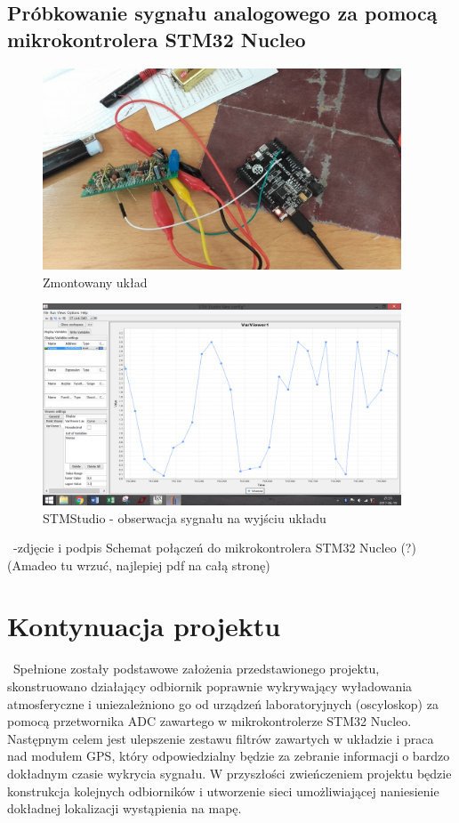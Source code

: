 \documentclass[12pt]{article}
\begin{document}
\subsection{Próbkowanie sygnału analogowego za pomocą mikrokontrolera STM32 Nucleo}
\begin{figure}[H]
\begin{center}
\includegraphics[width=0.95\textwidth]{figures/uklad.png}
\caption{Zmontowany układ}
\end{center}
\end{figure}
\begin{figure}[H]
\begin{center}
\includegraphics[width=0.95\textwidth]{figures/stm.png}
\caption{STMStudio - obserwacja sygnału na wyjściu układu}
\end{center}
\end{figure}
\ -zdjęcie i podpis Schemat połączeń do mikrokontrolera STM32 Nucleo (?)\\
(Amadeo tu wrzuć, najlepiej pdf na całą stronę)

\section{Kontynuacja projektu}
\ Spełnione zostały podstawowe założenia przedstawionego projektu, skonstruowano działający odbiornik poprawnie wykrywający wyładowania atmosferyczne i uniezależniono go od urządzeń laboratoryjnych (oscyloskop) za pomocą przetwornika ADC zawartego w mikrokontrolerze STM32 Nucleo. Następnym celem jest ulepszenie zestawu filtrów zawartych w układzie i praca nad modułem GPS, który odpowiedzialny będzie za zebranie informacji o bardzo dokładnym czasie wykrycia sygnału. W przyszłości zwieńczeniem projektu będzie konstrukcja kolejnych odbiorników i utworzenie sieci umożliwiającej naniesienie dokładnej lokalizacji wystąpienia na mapę. 
\end{document}
